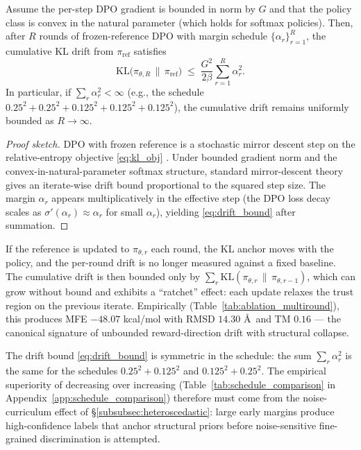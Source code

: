 {{\begin{theorem}
\label{thm:trust_region}
Assume the per-step DPO gradient is bounded in norm by $G$ and that the policy class is convex in the natural parameter (which holds for softmax policies). Then, after $R$ rounds of frozen-reference DPO with margin schedule $\{\alpha_r\}_{r=1}^R$, the cumulative KL drift from $\pi_{\mathrm{ref}}$ satisfies
\begin{equation}
\mathrm{KL}\big(\pi_{\theta, R} \,\|\, \pi_{\mathrm{ref}}\big)
\;\leq\; \frac{G^2}{2\beta}\sum_{r=1}^R \alpha_r^2.
\label{eq:drift_bound}
\end{equation}
In particular, if $\sum_r \alpha_r^2 < \infty$ (e.g., the schedule $0.25^2 + 0.25^2 + 0.125^2 + 0.125^2 + 0.125^2$), the cumulative drift remains uniformly bounded as $R \to \infty$.
\end{theorem}

\begin{proof}[Proof sketch]
DPO with frozen reference is a stochastic mirror descent step on the relative-entropy objective \eqref{eq:kl_obj} \citep{rafailov2023direct}. Under bounded gradient norm and the convex-in-natural-parameter softmax structure, standard mirror-descent theory \citep{NemirovskyYudin1983,Beck2017} gives an iterate-wise drift bound proportional to the squared step size. The margin $\alpha_r$ appears multiplicatively in the effective step (the DPO loss decay scales as $\sigma'(\alpha_r) \approx \alpha_r$ for small $\alpha_r$), yielding \eqref{eq:drift_bound} after summation.
\end{proof}

\begin{remark}
\label{rem:ref_update}
If the reference is updated to $\pi_{\theta, r}$ each round, the KL anchor moves with the policy, and the per-round drift is no longer measured against a fixed baseline. The cumulative drift is then bounded only by $\sum_r \mathrm{KL}(\pi_{\theta,r} \,\|\, \pi_{\theta,r-1})$, which can grow without bound and exhibits a ``ratchet'' effect: each update relaxes the trust region on the previous iterate. Empirically (Table~\ref{tab:ablation_multiround}), this produces MFE $-48.07$ kcal/mol with RMSD $14.30$ \AA\ and TM $0.16$ --- the canonical signature of unbounded reward-direction drift with structural collapse.
\end{remark}

\begin{remark}
The drift bound \eqref{eq:drift_bound} is symmetric in the schedule: the sum $\sum_r \alpha_r^2$ is the same for the schedules $0.25^2{+}0.125^2$ and $0.125^2{+}0.25^2$. The empirical superiority of decreasing over increasing (Table~\ref{tab:schedule_comparison} in Appendix~\ref{app:schedule_comparison}) therefore must come from the noise-curriculum effect of \S\ref{subsubsec:heteroscedastic}: large early margins produce high-confidence labels that anchor structural priors before noise-sensitive fine-grained discrimination is attempted.
\end{remark}


}}

